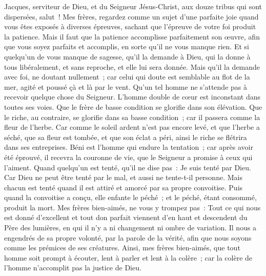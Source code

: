 \begin{multicols}{2}
\VerseOne{}Jacques, serviteur de Dieu, et du Seigneur Jésus-Christ, aux douze tribus qui sont dispersées, salut~!
Mes frères, regardez comme un sujet d'une parfaite joie quand vous êtes exposés à diverses épreuves,
sachant que l'épreuve de votre foi produit la patience.
Mais il faut que la patience accomplisse parfaitement son œuvre, afin que vous soyez parfaits et accomplis, en sorte qu'il ne vous manque rien.
Et si quelqu'un de vous manque de sagesse, qu'il la demande à Dieu, qui la donne à tous libéralement, et sans reproche, et elle lui sera donnée.
Mais qu'il la demande avec foi, ne doutant nullement~; car celui qui doute est semblable au flot de la mer, agité et poussé çà et là par le vent.
Qu'un tel homme ne s'attende pas à recevoir quelque chose du Seigneur.
L'homme double de cœur est inconstant dans toutes ses voies.
Que le frère de basse condition se glorifie dans son élévation.
Que le riche, au contraire, se glorifie dans sa basse condition~; car il passera comme la fleur de l'herbe.
Car comme le soleil ardent n'est pas encore levé, et que l'herbe a séché, que sa fleur est tombée, et que son éclat a péri, ainsi le riche se flétrira dans ses entreprises.
Béni est l'homme qui endure la tentation~; car après avoir été éprouvé, il recevra la couronne de vie, que le Seigneur a promise à ceux qui l'aiment.
Quand quelqu'un est tenté, qu'il ne dise pas~: Je suis tenté par Dieu. Car Dieu ne peut être tenté par le mal, et aussi ne tente-t-il personne.
Mais chacun est tenté quand il est attiré et amorcé par sa propre convoitise.
Puis quand la convoitise a conçu, elle enfante le péché~; et le péché, étant consommé, produit la mort.
Mes frères bien-aimés, ne vous y trompez pas~:
Tout ce qui nous est donné d'excellent et tout don parfait viennent d'en haut et descendent du Père des lumières, en qui il n'y a ni changement ni ombre de variation.
Il nous a engendrés de sa propre volonté, par la parole de la vérité, afin que nous soyons comme les prémices de ses créatures.
Ainsi, mes frères bien-aimés, que tout homme soit prompt à écouter, lent à parler et lent à la colère~;
car la colère de l'homme n'accomplit pas la justice de Dieu.

\end{multicols}
